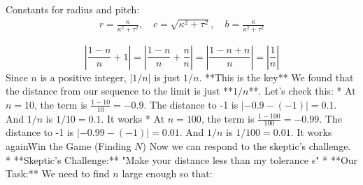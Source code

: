 \documentclass{article}
\begin{document}
Constants for radius and pitch:
\begin{align*}
    r = \frac{\kappa}{\kappa^2 + \tau^2}, \quad
    c = \sqrt{\kappa^2 + \tau^2}, \quad
    b = \frac{\kappa}{\kappa^2 + \tau^2}
\end{align*}

$$\left| \frac{1-n}{n} + 1 \right| = \left| \frac{1-n}{n} + \frac{n}{n} \right| = \left| \frac{1 - n + n}{n} \right| = \left| \frac{1}{n} \right| $$Since $n$ is a positive integer, $|1/n|$ is just $1/n$. **This is the key\!** We found that the distance from our sequence to the limit is just **$1/n$**. Let's check this: * At $n=10$, the term is $\frac{1-10}{10} = -0.9$. The distance to -1 is $|-0.9 - (-1)| = 0.1$. And $1/n$ is $1/10 = 0.1$. It works\! * At $n=100$, the term is $\frac{1-100}{100} = -0.99$. The distance to -1 is $|-0.99 - (-1)| = 0.01$. And $1/n$ is $1/100 = 0.01$. It works again\. Win the Game (Finding $N$) Now we can respond to the skeptic's challenge. * **Skeptic's Challenge:** "Make your distance less than my tolerance $\epsilon$\!" * **Our Task:** We need to find $n$ large enough so that:$$
$$
\end{document}
